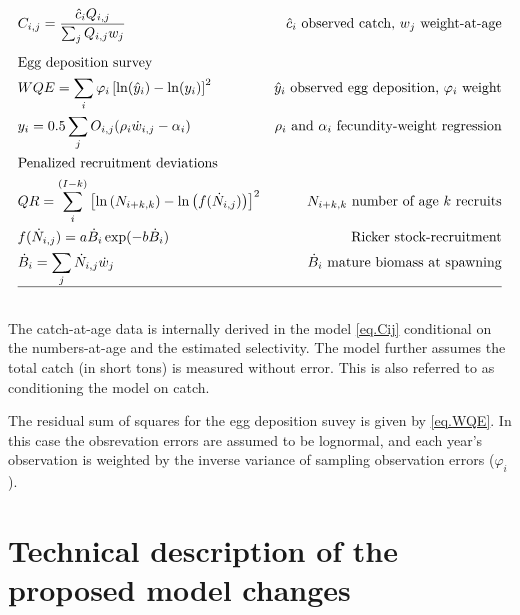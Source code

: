 \documentclass[12pt,letterpaper]{article}
\newcounter{saveEq}
\def\getEq{\setcounter{equation}{\value{saveEq}}}
\def\normalEq{ %
    \getEq
    \renewcommand{\theequation}{\arabic{section}.\arabic{equation}}}
\begin{document}
\begin{table}[ht]
\begin{align}
        & C_{i,j} = \frac{\hat{c}_i Q_{i,j}}{\sum_j Q_{i,j} w_j} & \mbox{$\hat{c}_i$ observed catch, $w_j$ weight-at-age} \label{eq.Cij}\\[1ex]
        &\mbox{Egg deposition survey} \nonumber\\
        & WQE = \sum_i \varphi_i\left[ \ln(\hat{y}_i)-\ln(y_i) \right]^2 & \mbox{$\hat{y}_i$ observed egg deposition, $\varphi_i$ weight}\label{eq.WQE}\\
        & y_i = 0.5 \sum_j O_{i,j} (\rho_i \dot{w}_{i,j}-\alpha_i) &\mbox{$\rho_i$ and $\alpha_i$ fecundity-weight regression} \\
        &\mbox{Penalized recruitment deviations} \nonumber \\
        & QR = \sum_{i}^{(I-k)} \left[  \ln\left(N_{i+k,k}\right) 
        - \ln\left(f(\dot{N}_{i,j}) \right) \right]^2 
          & \mbox{$N_{i+k,k}$ number of age $k$ recruits}\\
        & f(\dot{N}_{i,j}) = a \dot{B}_i \exp(-b \dot{B}_i) &\mbox{Ricker stock-recruitment}\\
        & \dot{B}_i = \sum_j \dot{N}_{i,j} \dot{w}_j &\mbox{$\dot{B}_i$ mature biomass at spawning} \\
        \hline \nonumber
      \end{align}
      \normalEq
    \end{table}
    The catch-at-age data is internally derived in the model \eqref{eq.Cij} conditional on the numbers-at-age and the estimated selectivity. The model further assumes the total catch (in short tons) is measured without error.  This is also referred to as conditioning the model on catch.

    The residual sum of squares for the egg deposition suvey is given by \eqref{eq.WQE}.  In this case the obsrevation errors are assumed to be lognormal, and each year's observation is weighted by the inverse variance of sampling observation errors ($\varphi_i$).




  \clearpage
  \section{Technical description of the proposed model changes} %
  \label{sec:methods}
  
\end{document}
